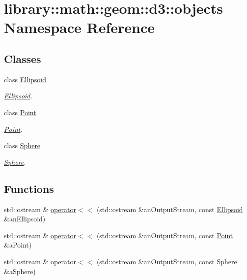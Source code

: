 \hypertarget{namespacelibrary_1_1math_1_1geom_1_1d3_1_1objects}{}\section{library\+:\+:math\+:\+:geom\+:\+:d3\+:\+:objects Namespace Reference}
\label{namespacelibrary_1_1math_1_1geom_1_1d3_1_1objects}
\subsection*{Classes}
\begin{DoxyCompactItemize}
\item 
class \hyperlink{classlibrary_1_1math_1_1geom_1_1d3_1_1objects_1_1_ellipsoid}{Ellipsoid}
\begin{DoxyCompactList}\small\item\em \hyperlink{classlibrary_1_1math_1_1geom_1_1d3_1_1objects_1_1_ellipsoid}{Ellipsoid}. \end{DoxyCompactList}\item 
class \hyperlink{classlibrary_1_1math_1_1geom_1_1d3_1_1objects_1_1_point}{Point}
\begin{DoxyCompactList}\small\item\em \hyperlink{classlibrary_1_1math_1_1geom_1_1d3_1_1objects_1_1_point}{Point}. \end{DoxyCompactList}\item 
class \hyperlink{classlibrary_1_1math_1_1geom_1_1d3_1_1objects_1_1_sphere}{Sphere}
\begin{DoxyCompactList}\small\item\em \hyperlink{classlibrary_1_1math_1_1geom_1_1d3_1_1objects_1_1_sphere}{Sphere}. \end{DoxyCompactList}\end{DoxyCompactItemize}
\subsection*{Functions}
\begin{DoxyCompactItemize}
\item 
std\+::ostream \& \hyperlink{namespacelibrary_1_1math_1_1geom_1_1d3_1_1objects_afec709c8a129bead70ffe69d72138f20}{operator$<$$<$} (std\+::ostream \&an\+Output\+Stream, const \hyperlink{classlibrary_1_1math_1_1geom_1_1d3_1_1objects_1_1_ellipsoid}{Ellipsoid} \&an\+Ellipsoid)
\item 
std\+::ostream \& \hyperlink{namespacelibrary_1_1math_1_1geom_1_1d3_1_1objects_aff4b6d4638922231d2c1c3cf6bbba8d2}{operator$<$$<$} (std\+::ostream \&an\+Output\+Stream, const \hyperlink{classlibrary_1_1math_1_1geom_1_1d3_1_1objects_1_1_point}{Point} \&a\+Point)
\item 
std\+::ostream \& \hyperlink{namespacelibrary_1_1math_1_1geom_1_1d3_1_1objects_a486555b5a738479bbc34beae21546945}{operator$<$$<$} (std\+::ostream \&an\+Output\+Stream, const \hyperlink{classlibrary_1_1math_1_1geom_1_1d3_1_1objects_1_1_sphere}{Sphere} \&a\+Sphere)
\end{DoxyCompactItemize}


